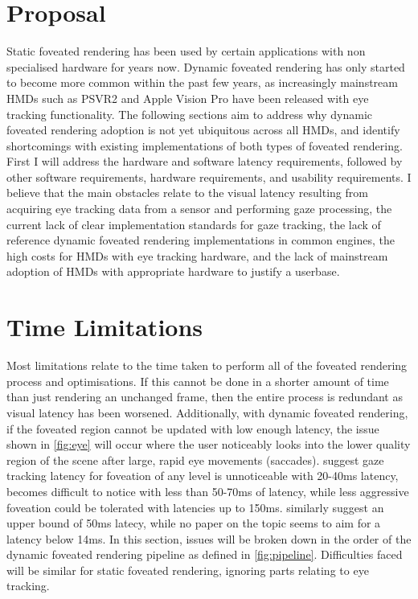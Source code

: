 \documentclass[a4paper,11pt]{article}
\begin{document}
\section{Proposal}
Static foveated rendering has been used by certain applications with non specialised hardware for years now. Dynamic foveated rendering has only started to become more common within the past few years, as increasingly mainstream HMDs such as PSVR2\cite{vr2_fove} and Apple Vision Pro\cite{vision_pro_announce} have been released with eye tracking functionality. The following sections aim to address why dynamic foveated rendering adoption is not yet ubiquitous across all HMDs, and identify shortcomings with existing implementations of both types of foveated rendering. First I will address the hardware and software latency requirements, followed by other software requirements, hardware requirements, and usability requirements. I believe that the main obstacles relate to the visual latency resulting from acquiring eye tracking data from a sensor and performing gaze processing, the current lack of clear implementation standards for gaze tracking, the lack of reference dynamic foveated rendering implementations in common engines, the high costs for HMDs with eye tracking hardware, and the lack of mainstream adoption of HMDs with appropriate hardware to justify a userbase.

\section{Time Limitations}
Most limitations relate to the time taken to perform all of the foveated rendering process and optimisations. If this cannot be done in a shorter amount of time than just rendering an unchanged frame, then the entire process is redundant as visual latency has been worsened. Additionally, with dynamic foveated rendering, if the foveated region cannot be updated with low enough latency, the issue shown in \cref{fig:eye} will occur where the user noticeably looks into the lower quality region of the scene after large, rapid eye movements (saccades). \textcite{albert2017latency} suggest gaze tracking latency for foveation of any level is unnoticeable with 20-40ms latency, becomes difficult to notice with less than 50-70ms of latency, while less aggressive foveation could be tolerated with latencies up to 150ms. \textcite{li2020optical} similarly suggest an upper bound of 50ms latecy, while no paper on the topic seems to aim for a latency below 14ms\cite{koskela2018instantaneous}. In this section, issues will be broken down in the order of the dynamic foveated rendering pipeline as defined in \cref{fig:pipeline}. Difficulties faced will be similar for static foveated rendering, ignoring parts relating to eye tracking.
\end{document}
